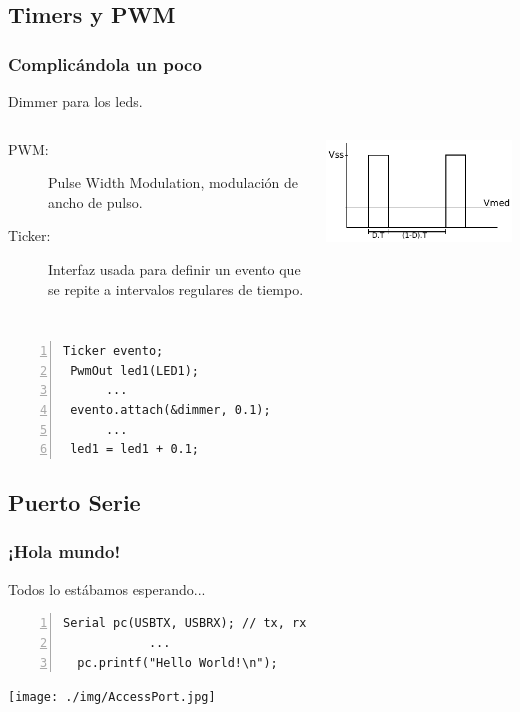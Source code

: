 \documentclass[compress]{beamer}
\begin{document}
\subsection{Timers y PWM}
\begin{frame}[fragile]
 \frametitle{Complicándola un poco}
Dimmer para los leds.
\begin{columns}
\begin{description}
 \item[PWM:] Pulse Width Modulation, modulación de ancho de pulso.
 \item[Ticker:] Interfaz usada para definir un evento que se repite a intervalos regulares de tiempo.
 \end{description}
\begin{center}
 \includegraphics[width=\textwidth]{./img/pwm_image.pdf}
\end{center}
\end{columns}

\begin{center}
\begin{Verbatim}[formatcom=\color{red},fontseries=b, numbers=left,numbersep=3pt]
 Ticker evento;
 PwmOut led1(LED1);
      ...
 evento.attach(&dimmer, 0.1);
      ...
 led1 = led1 + 0.1;
\end{Verbatim}
\end{center}
\end{frame}

\subsection{Puerto Serie}
\begin{frame}[fragile]
 \frametitle{¡Hola mundo!}
Todos lo estábamos esperando...
\begin{Verbatim}[formatcom=\color{red},fontseries=b, numbers=left,numbersep=3pt]
  Serial pc(USBTX, USBRX); // tx, rx
            ...
  pc.printf("Hello World!\n"); 
\end{Verbatim}
\begin{center}
 \texttt{[image: ./img/AccessPort.jpg]}
\end{center}
\end{frame}
\end{document}
